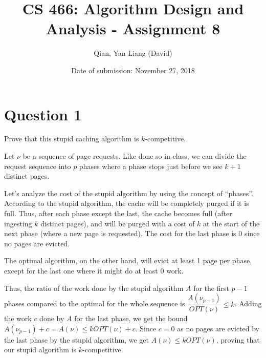 \documentclass{article}
\title{CS 466: Algorithm Design and Analysis - Assignment 8}
\author{Qian, Yan Liang (David)}
\date{Date of submission: November 27, 2018}
\begin{document}
\newpage

\section{Question 1}

Prove that this stupid caching algorithm is $k$-competitive.

Let $\nu$ be a sequence of page requests. Like done so in class, we can divide the request sequence into $p$ phases
where a phase stops just before we see $k + 1$ distinct pages.

Let's analyze the cost of the stupid algorithm by using the concept of ``phases''. According to the stupid algorithm,
the cache will be completely purged if it is full. Thus, after each phase except the last, the cache becomes full (after
ingesting $k$ distinct pages), and will be purged with a cost of $k$ at the start of the next phase (where a new page is
requested). The cost for the last phase is 0 since no pages are evicted.

The optimal algorithm, on the other hand, will evict at least 1 page per phase, except for the last one where it might
do at least 0 work.

Thus, the ratio of the work done by the stupid algorithm $A$ for the first $p - 1$ phases compared to the optimal for
the whole sequence is $\dfrac{A(\nu_{p-1})}{OPT(\nu)} \leq k$. Adding the work $c$ done by $A$ for the last phase, we
get the bound $A(\nu_{p-1}) + c = A(\nu) \leq k OPT(\nu) + c$. Since $c = 0$ as no pages are evicted by the last phase by
the stupid algorithm, we get $A(\nu) \leq k OPT(\nu)$, proving that our stupid algorithm is $k$-competitive.
\end{document}
